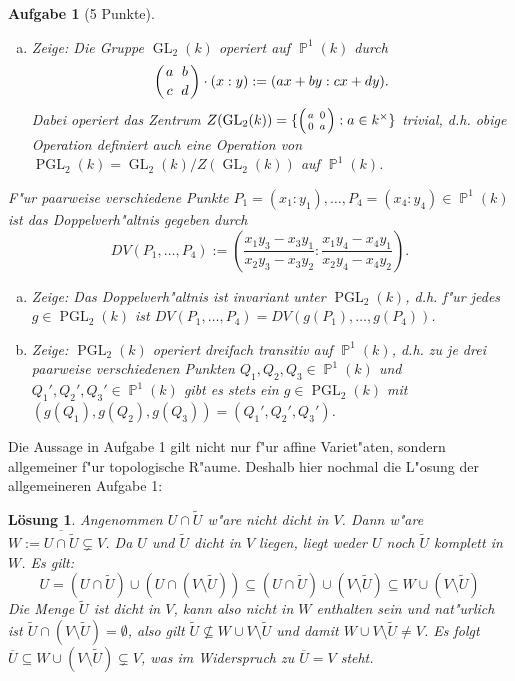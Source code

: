 \documentclass[a4paper, 12pt, numbers=noendperiod, chapterprefix=true]{scrbook}
\theoremstyle{break}
\newtheorem{Aufg}{Aufgabe}
\newtheorem{Loes}{L\"osung}
\theoremstyle{nonumberbreak}
\theoremstyle{nonumberplain}
\DeclareMathOperator{\GL}{GL}
\DeclareMathOperator{\PGL}{PGL} %
\newcommand{\A}{\mathbb{A}}
\DeclareMathOperator{\Projective}{\mathbb{P}} %
\begin{document}
\begin{Aufg}[5 Punkte]
\begin{enumerate}[a)]
\item \emph{Zeige}: Die Gruppe $\GL_2(k)$ operiert auf $\Projective^1(k)$ durch
	\[
		\left( {a \atop c} \ {b \atop d} \right) \cdot (x:y) := (ax+by:cx+dy) .
	\]
Dabei operiert das Zentrum $Z(\GL_2(k)) = \{ \Big( {a \atop 0} \, {0 \atop a} \Big) : a \in k^\times \}$ trivial, d.h. obige Operation definiert auch eine Operation von $\PGL_2(k) = \GL_2(k) / Z(\GL_2(k))$ auf $\Projective^1(k)$.
\end{enumerate}

F"ur paarweise verschiedene Punkte $P_1 = (x_1:y_1), \dots, P_4=(x_4:y_4) \in \Projective^1(k)$ ist das Doppelverh"altnis gegeben durch
	\[
		DV(P_1, \ldots, P_4) := \left( \frac{x_1y_3-x_3y_1}{x_2y_3-x_3y_2} : \frac{x_1y_4-x_4y_1}{x_2y_4-x_4y_2} \right).
	\]
\begin{enumerate}[a)]
	\item[b)] \emph{Zeige}: Das Doppelverh"altnis ist invariant unter $\PGL_2(k)$, d.h. f"ur jedes $g \in \PGL_2(k)$ ist $DV(P_1, \ldots, P_4) = DV(g(P_1), \ldots, g(P_4))$.
	\item[c)] \emph{Zeige}: $\PGL_2(k)$ operiert dreifach transitiv auf $\Projective^1(k)$, d.h. zu je drei paarweise verschiedenen Punkten $Q_1, Q_2, Q_3 \in \Projective^1(k)$ und $Q_1', Q_2', Q_3' \in \Projective^1(k)$ gibt es stets ein $g \in \PGL_2(k)$ mit $(g(Q_1), g(Q_2), g(Q_3)) = (Q_1', Q_2', Q_3')$.
\end{enumerate}\end{Aufg}

Die Aussage in Aufgabe 1 gilt nicht nur f"ur affine Variet"aten, sondern allgemeiner f"ur topologische R"aume. Deshalb hier nochmal die L"osung der allgemeineren Aufgabe 1:

\begin{Loes}
Angenommen $U \cap \tilde{U}$ w"are nicht dicht in $V$. Dann w"are $W := \overline{U \cap \tilde{U}} \subsetneq V$. Da $U$ und $\tilde{U}$ dicht in $V$ liegen, liegt weder $U$ noch $\tilde{U}$ komplett in $W$. Es gilt:
 \[U  = (U \cap \tilde{U}) \cup  (U \cap (V \setminus \tilde{U})) \subseteq (U \cap \tilde{U}) \cup (V \setminus \tilde{U}) \subseteq W \cup (V \setminus \tilde{U})\]
Die Menge $\tilde{U}$ ist dicht in $V$, kann also nicht in $W$ enthalten sein und nat"urlich ist $\tilde{U} \cap (V \setminus \tilde{U}) = \emptyset$, also gilt $\tilde{U} \nsubseteq W \cup V \setminus \tilde{U}$ und damit $W \cup V \setminus \tilde{U} \neq V$. Es folgt $\overline{U} \subseteq W \cup (V \setminus \tilde{U}) \subsetneq V$, was im Widerspruch zu $\overline{U} = V$ steht.
\end{Loes}
\end{document}
